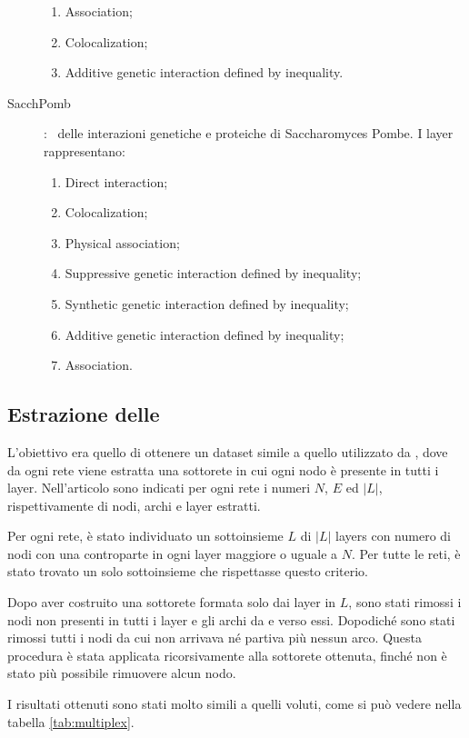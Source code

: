 \begin{description}
\begin{enumerate}
            \item Association;
            \item Colocalization;
            \item Additive genetic interaction defined by inequality.
        \end{enumerate} 
    \item[SacchPomb]: \mulx\ delle interazioni genetiche e proteiche di 
        Saccharomyces Pombe. I layer rappresentano:
        \begin{enumerate}
            \item Direct interaction;
            \item Colocalization;
            \item Physical association;
            \item Suppressive genetic interaction defined by inequality;
            \item Synthetic genetic interaction defined by inequality;
            \item Additive genetic interaction defined by inequality;
            \item Association.
        \end{enumerate} 
\end{description}

\subsection{Estrazione delle \mulxs}
L'obiettivo era quello di ottenere un dataset simile a quello utilizzato da \cite{basaras:infspmul},
dove da ogni rete viene estratta una sottorete in cui ogni nodo è presente in tutti i layer.
Nell'articolo sono indicati per ogni rete i numeri $N$, $E$ ed $|L|$, rispettivamente di nodi, 
archi e layer estratti.

Per ogni rete, è stato individuato un sottoinsieme $L$ di $|L|$ layers con
numero di nodi con una controparte in ogni layer maggiore o uguale a $N$. 
Per tutte le reti, è  stato trovato un solo sottoinsieme 
che rispettasse questo criterio.

Dopo aver costruito una sottorete formata solo dai layer in $L$, sono stati rimossi i nodi non presenti
in tutti i layer e gli archi da e verso essi. Dopodiché sono stati rimossi tutti i nodi da cui non arrivava
né partiva più nessun arco. Questa procedura è stata applicata ricorsivamente alla sottorete ottenuta, 
finché non è stato più possibile rimuovere alcun nodo. 

I risultati ottenuti sono stati molto simili a quelli voluti, come si può vedere nella tabella \vref{tab:multiplex}.

